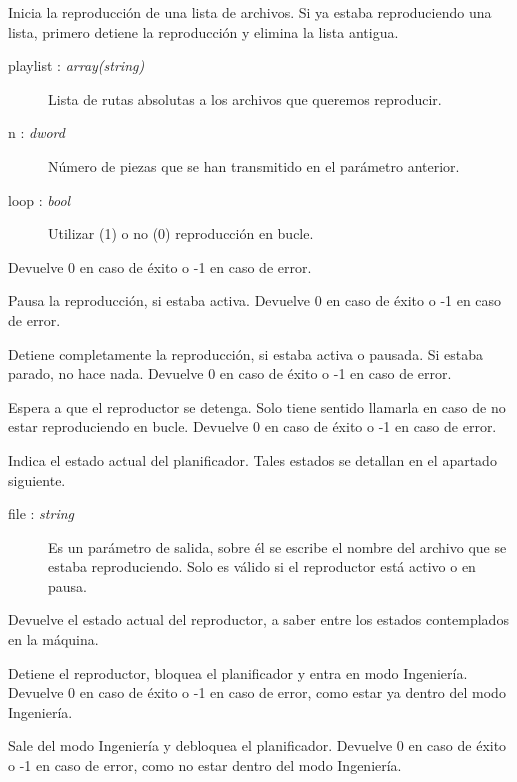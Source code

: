 \begin{description}[style=nextline]
	\item[player\_start (playlist, n, loop) : \textit{dword}]
	Inicia la reproducción de una lista de archivos. Si ya estaba reproduciendo una lista, primero detiene la reproducción y elimina la lista antigua.
	
	\begin{description}
		\item[playlist : \textit{array(string)}] Lista de rutas absolutas a los archivos que queremos reproducir.
		\item[n : \textit{dword}] Número de piezas que se han transmitido en el parámetro anterior.
		\item[loop : \textit{bool}] Utilizar (1) o no (0) reproducción en bucle.
	\end{description}
	
	Devuelve 0 en caso de éxito o -1 en caso de error.
	
	\item[player\_pause () : \textit{dword}]
	Pausa la reproducción, si estaba activa. Devuelve 0 en caso de éxito o -1 en caso de error.
	
	\item[player\_stop () : \textit{dword}]
	Detiene completamente la reproducción, si estaba activa o pausada. Si estaba parado, no hace nada. Devuelve 0 en caso de éxito o -1 en caso de error.
	
	\item[player\_wait () : \textit{dword}]
	Espera a que el reproductor se detenga. Solo tiene sentido llamarla en caso de no estar reproduciendo en bucle. Devuelve 0 en caso de éxito o -1 en caso de error.
	
	\item[player\_state (file) : \textit{enum}]
	Indica el estado actual del planificador. Tales estados se detallan en el apartado siguiente.
	
	\begin{description}
		\item[file : \textit{string}] Es un parámetro de salida, sobre él se escribe el nombre del archivo que se estaba reproduciendo. Solo es válido si el reproductor está activo o en pausa.
	\end{description}
	
	Devuelve el estado actual del reproductor, a saber entre los estados contemplados en la máquina.
	
	\item[player\_engineer\_enter () : \textit{dword}]
	Detiene el reproductor, bloquea el planificador y entra en modo Ingeniería. Devuelve 0 en caso de éxito o -1 en caso de error, como estar ya dentro del modo Ingeniería.
	
	\item[player\_engineer\_exit () : \textit{dword}]
	Sale del modo Ingeniería y debloquea el planificador. Devuelve 0 en caso de éxito o -1 en caso de error, como no estar dentro del modo Ingeniería.
	
\end{description}

